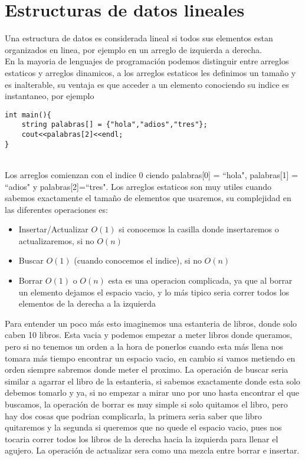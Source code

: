 \section{Estructuras de datos lineales}

Una estructura de datos es considerada lineal si todos sus elementos estan organizados en linea, por ejemplo en un arreglo de izquierda a derecha.
\\En la mayoria de lenguajes de programación podemos distinguir entre arreglos estaticos y arreglos dinamicos, a los arreglos estaticos les definimos un tamaño y es inalterable, su ventaja es que acceder a un elemento conociendo su indice es instantaneo, por ejemplo
\\\begin{minipage}{\textwidth}
\begin{lstlisting}[style=C,caption=arregloEstatico.cpp]
int main(){
    string palabras[] = {"hola","adios","tres"};
    cout<<palabras[2]<<endl;
}
\end{lstlisting}
\end{minipage}
\\Los arreglos comienzan con el indice 0 ciendo palabras[0] = ``hola", palabras[1] = ``adios"{} y palabras[2]=``tres". Los arreglos estaticos son muy utiles cuando sabemos exactamente el tamaño de elementos que usaremos, su complejidad en las diferentes operaciones es:
\begin{itemize}
    \item Insertar/Actualizar $O(1)$ si conocemos la casilla donde insertaremos o actualizaremos, si no $O(n)$
    \item Buscar   $O(1)$ (cuando conocemos el indice), si no $O(n)$
    \item Borrar   $O(1)$ o $O(n)$ esta es una operacion complicada, ya que al borrar un elemento dejamos el espacio vacio, y lo más tipico seria correr todos los elementos de la derecha a la izquierda
\end{itemize}
Para entender un poco más esto imaginemos una estanteria de libros, donde solo caben 10 libros. Esta vacia y podemos empezar a meter libros donde queramos, pero si no tenemos un orden a la hora de ponerlos cuando esta más llena nos tomara más tiempo encontrar un espacio vacio, en cambio si vamos metiendo en orden siempre sabremos donde meter el proximo. La operación de buscar seria similar a agarrar el libro de la estanteria, si sabemos exactamente donde esta solo debemos tomarlo y ya, si no empezar a mirar uno por uno hasta encontrar el que buscamos, la operación de borrar es muy simple si solo quitamos el libro, pero hay dos cosas que podrian complicarla, la primera seria saber que libro quitaremos y la segunda si queremos que no quede el espacio vacio, pues nos tocaria correr todos los libros de la derecha hacia la izquierda para llenar el agujero. La operación de actualizar sera como una mezcla entre borrar e insertar.
